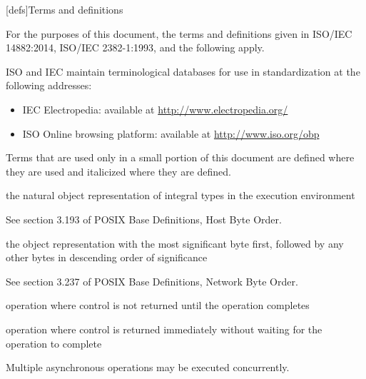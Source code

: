
[defs]{Terms and definitions}

\pnum
{}%
For the purposes of this document,
the terms and definitions
given in ISO/IEC 14882:2014,
ISO/IEC 2382-1:1993,
and the following apply.

\pnum
ISO and IEC maintain terminological databases
for use in standardization
at the following addresses:
\begin{itemize}
\item IEC Electropedia: available at \url{http://www.electropedia.org/}
\item ISO Online browsing platform: available at \url{http://www.iso.org/obp}
\end{itemize}

\pnum
Terms that are used only in a small portion of this document
are defined where they are used and italicized where they are
defined.

%
the natural object representation of integral types in the execution environment

\begin{defnote}
See section 3.193 of POSIX Base Definitions, Host Byte Order.
\end{defnote}

%
the object representation with the most significant byte first,
followed by any other bytes in descending order of significance

\begin{defnote}
See section 3.237 of POSIX Base Definitions, Network Byte Order.
\end{defnote}

%
operation where control is not returned until the operation completes

%
operation where control is returned immediately without waiting for the operation to complete

\begin{defnote}Multiple asynchronous operations may be executed concurrently.\end{defnote}

\setcounter{tocdepth}{1}
